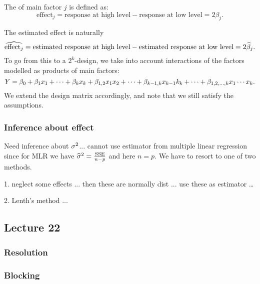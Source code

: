 \begin{definition}
    The  of main factor $j$ is defined as:
    $$
        \textrm{effect}_j = \textrm{response at high level} - \textrm{response at low level} = 2\beta_j.
    $$
\end{definition}
The estimated effect is naturally
$$
    \widehat{\textrm{effect}_j} = \textrm{estimated response at high level} - \textrm{estimated response at low level} = 2\widehat{\beta}_j.
$$
To go from this to a $2^k$-design, we take into account interactions of the factors modelled as products of main factors:
$$
    Y = \beta_0 + \beta_1x_1+\dots+\beta_kx_k + \beta_{1,2}x_1x_2 + \dots+\beta_{k-1,k}x_{k-1}k_{k}+\dots+\beta_{1,2,\dots,k}x_1\cdots x_k.
$$
We extend the design matrix accordingly, and note that we still satisfy the assumptions. 


\subsubsection{Inference about effect}

Need inference about $\sigma^2$... cannot use estimator from multiple linear regression since for MLR we have $\widehat{\sigma}^2=\frac{\textrm{SSE}}{n-p}$ and here $n=p$. We have to resort to one of two methods.

1. neglect some effects ... then these are normally dist ... use these as estimator \dots

2. Lenth's method ...



\subsection*{Lecture  22}



\subsubsection*{Resolution}



\subsubsection*{Blocking}